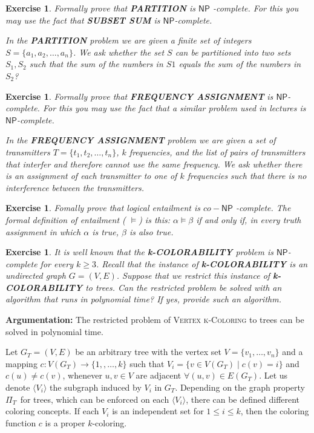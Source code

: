 \documentclass[11pt]{article}
\newtheorem{exercise}[theorem]{Exercise}
\begin{document}
\begin{exercise}
\label{ex:partition} Formally prove that \textbf{PARTITION} is $\mathsf{NP}$%
-complete. For this you may use the fact that \textbf{SUBSET SUM} is $%
\mathsf{NP}$-complete.

\smallskip \noindent In the \textbf{PARTITION} problem we are given a finite
set of integers $S=\{a_{1},a_{2},\ldots ,a_{n}\}$. We ask whether the set $S$
can be partitioned into two sets $S_{1},S_{2}$ such that the sum of the
numbers in $S1$ equals the sum of the numbers in $S_{2}$?
\end{exercise}

\begin{exercise}
\label{ex:frequency} Formally prove that \textbf{FREQUENCY ASSIGNMENT} is $%
\mathsf{NP}$-complete. For this you may use the fact that a similar problem
used in lectures is $\mathsf{NP}$-complete.

\noindent In the \textbf{FREQUENCY ASSIGNMENT} problem we are given a set of
transmitters $T=\{t_{1},t_{2},\ldots ,t_{n}\}$, $k$ frequencies, and the
list of pairs of transmitters that interfer and therefore cannot use the
same frequency. We ask whether there is an assignment of each transmitter to
one of $k$ frequencies such that there is no interference between the
transmitters.
\end{exercise}

\begin{exercise}
\label{ex:CO-NP} Fomally prove that logical entailment is $co-\mathsf{NP}$%
-complete. The formal definition of entailment ( $\models $) is this: $%
\alpha \models \beta $ if and only if, in every truth assignment in which $%
\alpha $ is true, $\beta $ is also true.
\end{exercise}

\begin{exercise}
\label{ex:Colors} It is well known that the \textbf{k-COLORABILITY} problem
is $\mathsf{NP}$-complete for every $k\geq 3$. Recall that the instance of 
\textbf{k-COLORABILITY} is an undirected graph $G=(V,E)$. Suppose that we
restrict this instance of \textbf{k-COLORABILITY} to trees. Can the
restricted problem be solved with an algorithm that runs in polynomial time?
If yes, provide such an algorithm.
\end{exercise}

\textbf{Argumentation:} The restricted problem of \textsc{Vertex k-Coloring}
to trees can be solved in polynomial time.

Let $G_{T}=(V,E)$ be an arbitrary tree with the vertex set $V=\{v_{1},\ldots
,v_{n}\}$ and a mapping $c:V(G_{T})\rightarrow \{1,,\ldots ,k\}$ such that $%
V_{i}=\{v\in V(G_{T})\mid c(v)=i\}$ and $c(u)\neq c(v)$, whenever $u,v\in V$
are adjacent $\forall (u,v)\in E(G_{T})$. Let us denote $\langle
V_{i}\rangle $ the subgraph induced by $V_{i}$ in $G_{T}$. Depending on the
graph property $\Pi _{T\text{ }}$for trees, which can be enforced on each $%
\langle V_{i}\rangle $, there can be defined different coloring concepts. If
each $V_{i}$ is an independent set for $1\leq i\leq k$, then the coloring
function $c$ is a proper $k$-coloring.
\end{document}

